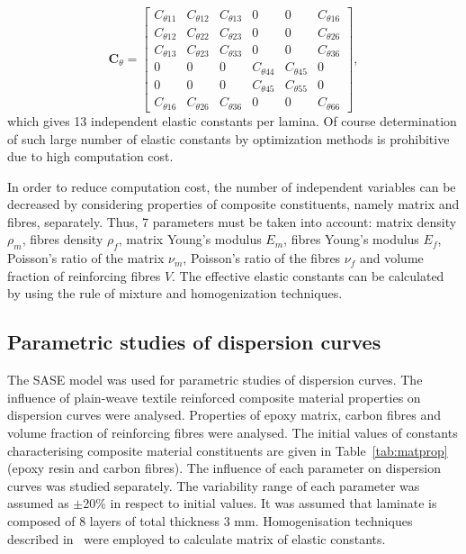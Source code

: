 \documentclass[preprint,12pt]{elsarticle}
\newcommand{\matr}[1]{\mathbf{#1}} %
\begin{document}
 \begin{equation}
 \matr{C}_{\theta} = \left[\begin{array}{cccccc} C_{\theta 11} & C_{\theta 12}& C_{\theta 13} & 0&0&C_{\theta 16}\\[2pt]
 C_{\theta 12}& C_{\theta 22} & C_{\theta 23}& 0 &0&C_{\theta 26}\\[2pt]
 C_{\theta 13}&C_{\theta 23}&C_{\theta 33}&0&0&C_{\theta 36}\\[2pt]
 0& 0&0&C_{\theta 44}& C_{\theta 45}&0\\[2pt]
 0&0&0&C_{\theta 45}&C_{\theta 55}&0\\[2pt]
 C_{\theta 16}&C_{\theta 26} &C_{\theta 36}&0&0&C_{\theta 66}
 \end{array}\right], 
 \label{eq:elastic_constatns_theta}
 \end{equation} 
 which gives 13 independent elastic constants per lamina. Of course determination of such large number of elastic constants by optimization methods is prohibitive due to high computation cost. 
 
 In order to reduce computation cost, the number of independent variables can be decreased by considering properties of composite constituents, namely matrix and fibres, separately. Thus,  7 parameters must be taken into account: matrix density $\rho_m$, fibres density $\rho_f$, matrix Young's modulus $E_m$, fibres Young's modulus $E_f$, Poisson's ratio of the matrix $\nu_m$, Poisson's ratio of the fibres $\nu_f$ and volume fraction of reinforcing fibres $V$. The effective elastic constants can be calculated by using the rule of mixture and homogenization techniques.
 \subsection{Parametric studies of dispersion curves \label{sec:parametric}}
 The SASE model was used for parametric studies of dispersion curves. The influence of plain-weave textile reinforced composite material properties on dispersion curves were analysed. Properties of epoxy matrix, carbon fibres and volume fraction of reinforcing fibres were analysed. The initial values of constants characterising composite material constituents are given in Table~\ref{tab:matprop} (epoxy resin and carbon fibres). The influence of each parameter on dispersion curves was studied separately. The variability range of each parameter was assumed as $\pm$20\% in respect to initial values.  It was assumed that laminate is composed of 8 layers of total thickness 3 mm. Homogenisation techniques described in~\cite{Barbero2006,Adumitroaie2012} were employed to calculate matrix of elastic constants.
 
\end{document}
